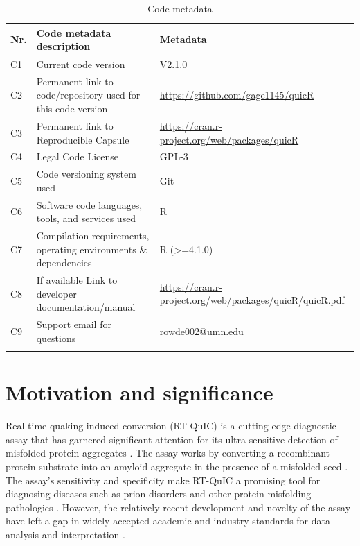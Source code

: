 \documentclass[preprint,12pt,a4paper]{elsarticle}
\begin{document}
    \begin{table}[ht]
        \label{tbl:codeMetadata} 
        \begin{tabular}{|l|p{6cm}|p{6cm}|}
            \hline{}
            \textbf{Nr.} & \textbf{Code metadata description} & \textbf{Metadata} \\
            \hline{}
            C1 & Current code version & V2.1.0 \\
            \hline{}
            C2 & Permanent link to code/repository used for this code version & \url{https://github.com/gage1145/quicR} \\
            \hline{}
            C3  & Permanent link to Reproducible Capsule & \url{https://cran.r-project.org/web/packages/quicR}\\
            \hline{}
            C4 & Legal Code License & GPL-3 \\
            \hline{}
            C5 & Code versioning system used & Git \\
            \hline{}
            C6 & Software code languages, tools, and services used & R \\
            \hline{}
            C7 & Compilation requirements, operating environments \& dependencies & R (>=4.1.0) \\
            \hline{}
            C8 & If available Link to developer documentation/manual & \url{https://cran.r-project.org/web/packages/quicR/quicR.pdf}\\
            \hline{}
            C9 & Support email for questions & rowde002@umn.edu\\
            \hline{}
        \end{tabular}
        \caption{Code metadata}
    \end{table}

    \section{Motivation and significance}
        Real-time quaking induced conversion (RT-QuIC) is a cutting-edge diagnostic assay that has garnered significant attention for its ultra-sensitive detection of misfolded protein aggregates \cite{Wilham2010, Atarashi2011}. The assay works by converting a recombinant protein substrate into an amyloid aggregate in the presence of a misfolded seed \cite{Wilham2010, Orru2012, Orru2017, Orru2015, Bongianni2019, Dassanayake2016, Hwang2018, Groveman2018, Metrick2020}. The assay's sensitivity and specificity make RT-QuIC a promising tool for diagnosing diseases such as prion disorders and other protein misfolding pathologies \cite{Fiorini2020, Franceschini2017, Picasso-Risso2022, Holz2021}. However, the relatively recent development and novelty of the assay have left a gap in widely accepted academic and industry standards for data analysis and interpretation \cite{Rowden2023}.
\end{document}
